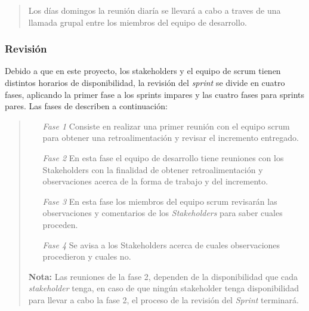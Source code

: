     \begin{quote}
    Los días domingos la reunión diaría se llevará a cabo a traves de una llamada grupal
    entre los miembros del equipo de desarrollo.
    \end{quote}

\subsubsection{Revisión}

 \noindent Debido a que en este proyecto, los stakeholders y el equipo de scrum tienen distintos horarios
 de disponibilidad, la revisión del {\it sprint} se divide en cuatro fases, aplicando la primer fase a los sprints
 impares y las cuatro fases para sprints pares. Las fases de describen a continuación:
 
    \begin{quote}
    \begin{itemize}
    \item[\it Fase 1]
        Consiste en realizar una primer reunión con el equipo scrum para obtener una
        retroalimentación y revisar el incremento entregado.

    \item[\it Fase 2]
        En esta fase el equipo de desarrollo tiene reuniones con los Stakeholders con la
        finalidad de obtener retroalimentación y observaciones acerca de la forma de
        trabajo y del incremento.

    \item[\it Fase 3] 
        En esta fase los miembros del equipo scrum revisarán las observaciones y
        comentarios de los {\it Stakeholders} para saber cuales proceden.

    \item[\it Fase 4]
        Se avisa a los Stakeholders acerca de cuales observaciones procedieron y cuales no.\\
    \end{itemize}    
    
    {\bf Nota:} Las reuniones de la fase 2, dependen de la disponibilidad que cada {\it stakeholder} tenga,
                en caso de que ningún stakeholder tenga disponibilidad para llevar a cabo la fase 2,
                el proceso de la revisión del {\it Sprint} terminará.
    \end{quote}

 \noindent {}

